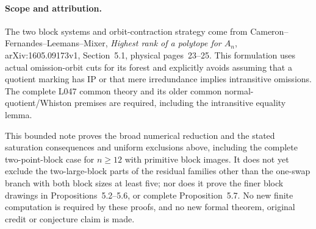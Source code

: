 \documentclass[11pt,a4paper]{article}
\begin{document}
\paragraph{Scope and attribution.}
The two block systems and orbit-contraction strategy come from
Cameron--Fernandes--Leemans--Mixer, \emph{Highest rank of a
polytope for $A_n$}, arXiv:1605.09173v1, Section~5.1, physical
pages~23--25. This formulation uses actual omission-orbit cuts
for its forest and explicitly avoids assuming that a quotient
marking has IP or that mere irredundance implies intransitive
omissions. The complete L047 common theory and its older common
normal-quotient/Whiston premises are required, including the
intransitive equality lemma.

This bounded note proves the broad numerical reduction and the
stated saturation consequences and uniform exclusions above,
including the complete two-point-block case for $n\geq12$
with primitive block images. It does not yet exclude the
two-large-block parts of the residual families other than the
one-swap branch with both block sizes at least five; nor does it prove the finer block drawings
in Propositions~5.2--5.6, or complete Proposition~5.7. No new finite computation is required by these proofs, and no new
formal theorem, original credit or conjecture claim is made.
\end{document}
